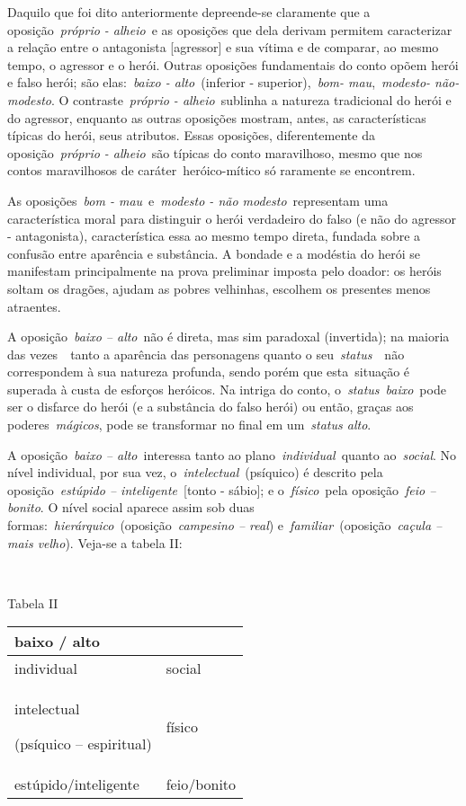 Daquilo que foi dito anteriormente depreende-se claramente que a
oposição~\emph{próprio - alheio}~e as oposições que dela derivam
permitem caracterizar a relação entre o antagonista {[}agressor{]} e sua
vítima e de comparar, ao mesmo tempo, o agressor e o herói. Outras
oposições fundamentais do conto opõem herói e falso herói; são
elas:~\emph{baixo - alto}~(inferior - superior),~\emph{bom-
mau},~\emph{modesto- não-modesto}. O contraste~\emph{próprio -
alheio}~sublinha a natureza tradicional do herói e do agressor, enquanto
as outras oposições mostram, antes, as características típicas do herói,
seus atributos. Essas oposições, diferentemente da
oposição~\emph{próprio - alheio}~são típicas do conto maravilhoso, mesmo
que nos contos maravilhosos de caráter~heróico-mítico só raramente se
encontrem.

As oposições~\emph{bom - mau}~e~\emph{modesto - não modesto}~representam
uma característica moral para distinguir o herói verdadeiro do falso (e
não do agressor - antagonista), característica essa ao mesmo tempo
direta, fundada sobre a confusão entre aparência e substância. A bondade
e a modéstia do herói se manifestam principalmente na prova preliminar
imposta pelo doador: os heróis soltam os dragões, ajudam as pobres
velhinhas, escolhem os presentes menos atraentes.

A oposição~\emph{baixo -- alto}~não é direta, mas sim paradoxal
(invertida); na maioria das vezes~~tanto a aparência das personagens
quanto o seu~\emph{status}~~não correspondem à sua natureza profunda,
sendo porém que esta~situação é superada à custa de esforços heróicos.
Na intriga do conto, o~\emph{status}~\emph{baixo}~pode ser o disfarce do
herói (e a substância do falso herói) ou então, graças aos
poderes~\emph{mágicos}, pode se transformar no final em um~\emph{status
alto}.

A oposição~\emph{baixo -- alto}~interessa tanto ao
plano~\emph{individual}~quanto ao~\emph{social}. No nível individual,
por sua vez, o~\emph{intelectual}~(psíquico) é descrito pela
oposição~\emph{estúpido -- inteligente}~{[}tonto - sábio{]}; e
o~\emph{físico}~pela oposição~\emph{feio -- bonito}. O nível social
aparece assim sob duas
formas:~\emph{hierárquico}~(oposição~\emph{campesino -- real})
e~\emph{familiar}~(oposição~\emph{caçula -- mais velho}). Veja-se a
tabela II:

~

Tabela II

\begin{longtable}[]{@{}ll@{}}
\toprule
baixo / alto\tabularnewline
\midrule
\endhead
individual & social\tabularnewline
\begin{minipage}[t]{0.48\columnwidth}\raggedright\strut
intelectual

(psíquico -- espiritual)\strut
\end{minipage} & \begin{minipage}[t]{0.48\columnwidth}\raggedright\strut
físico\strut
\end{minipage}\tabularnewline
estúpido/inteligente & feio/bonito\tabularnewline
\bottomrule
\end{longtable}

